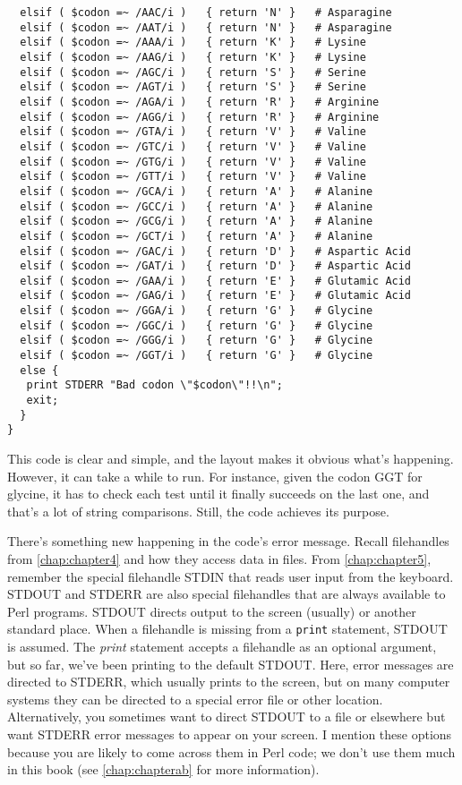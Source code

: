 \begin{lstlisting}
  elsif ( $codon =~ /AAC/i )   { return 'N' }   # Asparagine
  elsif ( $codon =~ /AAT/i )   { return 'N' }   # Asparagine
  elsif ( $codon =~ /AAA/i )   { return 'K' }   # Lysine
  elsif ( $codon =~ /AAG/i )   { return 'K' }   # Lysine
  elsif ( $codon =~ /AGC/i )   { return 'S' }   # Serine
  elsif ( $codon =~ /AGT/i )   { return 'S' }   # Serine
  elsif ( $codon =~ /AGA/i )   { return 'R' }   # Arginine
  elsif ( $codon =~ /AGG/i )   { return 'R' }   # Arginine
  elsif ( $codon =~ /GTA/i )   { return 'V' }   # Valine
  elsif ( $codon =~ /GTC/i )   { return 'V' }   # Valine
  elsif ( $codon =~ /GTG/i )   { return 'V' }   # Valine
  elsif ( $codon =~ /GTT/i )   { return 'V' }   # Valine
  elsif ( $codon =~ /GCA/i )   { return 'A' }   # Alanine
  elsif ( $codon =~ /GCC/i )   { return 'A' }   # Alanine
  elsif ( $codon =~ /GCG/i )   { return 'A' }   # Alanine
  elsif ( $codon =~ /GCT/i )   { return 'A' }   # Alanine
  elsif ( $codon =~ /GAC/i )   { return 'D' }   # Aspartic Acid
  elsif ( $codon =~ /GAT/i )   { return 'D' }   # Aspartic Acid
  elsif ( $codon =~ /GAA/i )   { return 'E' }   # Glutamic Acid
  elsif ( $codon =~ /GAG/i )   { return 'E' }   # Glutamic Acid
  elsif ( $codon =~ /GGA/i )   { return 'G' }   # Glycine
  elsif ( $codon =~ /GGC/i )   { return 'G' }   # Glycine
  elsif ( $codon =~ /GGG/i )   { return 'G' }   # Glycine
  elsif ( $codon =~ /GGT/i )   { return 'G' }   # Glycine
  else {
   print STDERR "Bad codon \"$codon\"!!\n";
   exit;
  }
}
\end{lstlisting}

This code is clear and simple, and the layout makes it obvious what's happening. However, it can take a while to run. For instance, given the codon GGT for glycine, it has to check each test until it finally succeeds on the last one, and that's a lot of string comparisons. Still, the code achieves its purpose.

There's something new happening in the code's error message. Recall filehandles from \autoref{chap:chapter4} and how they access data in files. From \autoref{chap:chapter5}, remember the special filehandle STDIN that reads user input from the keyboard. STDOUT and STDERR are also special filehandles that are always available to Perl programs. STDOUT directs output to the screen (usually) or another standard place. When a filehandle is missing from a \verb|print| statement, STDOUT is assumed. The \textit{print} statement accepts a filehandle as an optional argument, but so far, we've been printing to the default STDOUT. Here, error messages are directed to STDERR, which usually prints to the screen, but on many computer systems they can be directed to a special error file or other location. Alternatively, you sometimes want to direct STDOUT to a file or elsewhere but want STDERR error messages to appear on your screen. I mention these options because you are likely to come across them in Perl code; we don't use them much in this book (see \autoref{chap:chapterab} for more information).  

